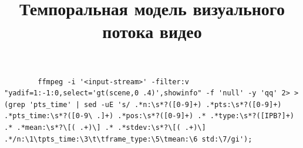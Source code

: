 \documentclass{.local/lib/classes/ndvr-vector-image-standalone}
\title[NDVR thesis-abstract]{%
    Темпоральная модель визуального потока видео%
}
\begin{document}
    \begin{verbatim}
        ffmpeg -i '<input-stream>' -filter:v "yadif=1:-1:0,select='gt(scene,0 .4)',showinfo" -f 'null' -y 'qq' 2> >(grep 'pts_time' | sed -uE 's/ .*n:\s*?([0-9]+) .*pts:\s*?([0-9]+) .*pts_time:\s*?([0-9\ .]+) .*pos:\s*?([0-9]+) .* .*type:\s*?([IPB?]+) .* .*mean:\s*?\[( .+)\] .* .*stdev:\s*?\[( .+)\] .*/n:\1\tpts_time:\3\t\tframe_type:\5\tmean:\6 std:\7/gi');
    \end{verbatim}
\end{document}
